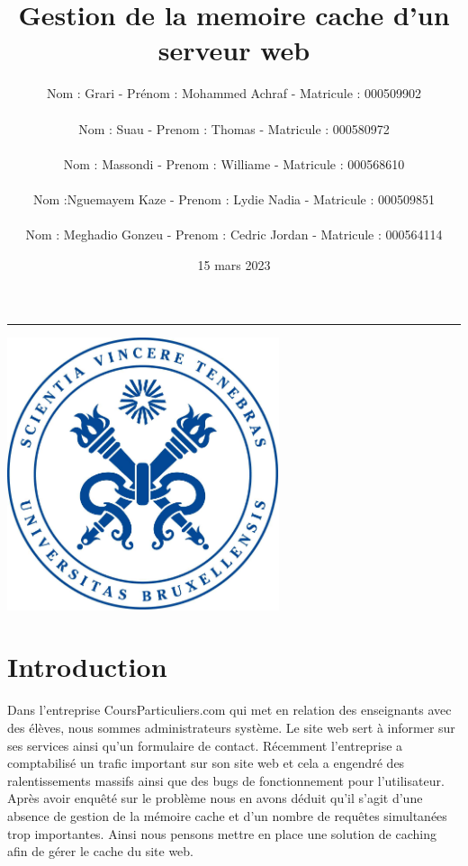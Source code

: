 \documentclass{article}
\title{Gestion de la memoire cache d'un serveur web}
\author{Nom : Grari \hspace{0.25cm} - \hspace{0.25cm} Prénom : Mohammed Achraf\hspace{0.25cm}  - \hspace{0.25cm} Matricule : 000509902\\\\Nom : Suau\hspace{0.25cm} -\hspace{0.25cm} Prenom : Thomas \hspace{0.25cm}-\hspace{0.25cm} Matricule : 000580972\\\\Nom : Massondi\hspace{0.25cm} -\hspace{0.25cm} Prenom : Williame \hspace{0.25cm}-\hspace{0.25cm} Matricule : 000568610\\\\Nom :Nguemayem Kaze\hspace{0.25cm} -\hspace{0.25cm} Prenom : Lydie Nadia \hspace{0.25cm}-\hspace{0.25cm} Matricule : 000509851 \\\\Nom : Meghadio Gonzeu\hspace{0.25cm} -\hspace{0.25cm} Prenom : Cedric Jordan  \hspace{0.25cm}-\hspace{0.25cm} Matricule : 000564114}
\date{15 mars 2023}
\begin{document}
\maketitle\hrule

  \begin{center}
  \vspace{1.5 cm}
    \includegraphics[width=0.6\textwidth]{logo.png}
    \captionsetup{labelformat=empty}
    \label{fig:0}
  \end{center}
  
\newpage
\tableofcontents
\newpage

\section{Introduction}


Dans l'entreprise CoursParticuliers.com qui met en relation des enseignants avec des élèves, nous sommes administrateurs système. Le site web sert à informer sur ses services ainsi qu'un formulaire de contact. 
Récemment l'entreprise a comptabilisé un trafic important sur son site web et cela a engendré des ralentissements massifs ainsi que des bugs de fonctionnement pour l'utilisateur. 
Après avoir enquêté sur le problème nous en avons déduit qu'il s'agit d'une absence de gestion de la mémoire cache et d'un nombre de requêtes simultanées trop importantes. 
Ainsi nous pensons mettre en place une solution de caching afin de gérer le cache du site web. 
\end{document}

